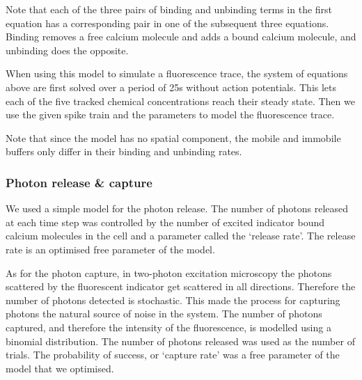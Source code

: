 \documentclass[a4paper,12pt]{article}
\theoremstyle{definition}
\begin{document}
Note that each of the three pairs of binding and unbinding terms in the first equation has a corresponding pair in one of the subsequent three equations. Binding removes a free calcium molecule and adds a bound calcium molecule, and unbinding does the opposite.

When using this model to simulate a fluorescence trace, the system of equations above are first solved over a period of 25s without action potentials. This lets each of the five tracked chemical concentrations reach their steady state. Then we use the given spike train and the parameters to model the fluorescence trace.

Note that since the model has no spatial component, the mobile and immobile buffers only differ in their binding and unbinding rates.

\subsubsection{Photon release \& capture}
We used a simple model for the photon release. The number of photons released at each time step was controlled by the number of excited indicator bound calcium molecules in the cell and a parameter called the `release rate'. The release rate is an optimised free parameter of the model.

As for the photon capture, in two-photon excitation microscopy the photons scattered by the fluorescent indicator get scattered in all directions. Therefore the number of photons detected is stochastic. This made the process for capturing photons the natural source of noise in the system. The number of photons captured, and therefore the intensity of the fluorescence, is modelled using a binomial distribution. The number of photons released was used as the number of trials. The probability of success, or `capture rate' was a free parameter of the model that we optimised.
\end{document}
